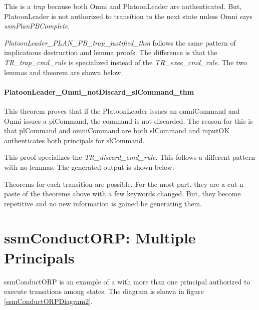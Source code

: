 \documentclass[../../main/main.tex]{subfiles}
\begin{document}
This is a \textit{trap} because both Omni and PlatoonLeader are authenticated.  But, PlatoonLeader is not authorized to transition to the next state unless Omni says \textit{ssmPlanPBComplete}.



\textit{PlatoonLeader_PLAN_PB_trap_justified_thm} follows the same pattern of implications destruction and lemma proofs.  The difference is that the \textit{TR_trap_cmd_rule} is specialized instead of the \textit{TR_exec_cmd_rule}.  The two lemmas and theorem are shown below.  

\HOLssmPBIntegratedTheoremsPlatoonLeaderXXPLANXXPBXXtrapXXlemma
{}\HOLssmPBIntegratedTheoremsPlatoonLeaderXXPLANXXPBXXtrapXXjustifiedXXlemma
\HOLssmPBIntegratedTheoremsPlatoonLeaderXXPLANXXPBXXtrapXXjustifiedXXthm

\paragraph*{PlatoonLeader_Omni_notDiscard_slCommand_thm}
This theorem proves that if the PlatoonLeader issues an omniCommand and Omni issues a plCommand, the command is not discarded.  The reason for this is that plCommand and omniCommand are both slCommand and  inputOK authenticates both principals for slCommand.  

This proof specializes the \textit{TR_discard_cmd_rule}.  This follows a different pattern with no lemmas.  The  generated output is shown below.

\HOLssmPBIntegratedTheoremsPlatoonLeaderXXOmniXXnotDiscardXXslCommandXXthm

Theorems for each transition are possible. For the most part, they are a cut-n-paste of the theorems above with a few keywords changed.  But, they become repetitive and no new information is gained be generating them. 
\section{ssmConductORP: Multiple Principals}
ssmConductORP is an example of a  with more than one principal authorized to execute transitions among states. The diagram is shown in figure \ref{ssmConductORPDiagram2}.
\end{document}
